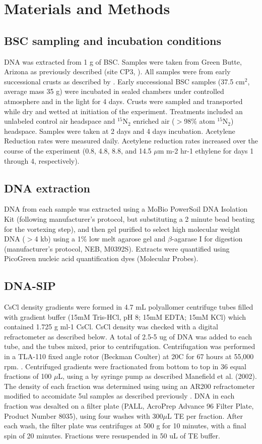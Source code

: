 \section{Materials and Methods}
\subsection{BSC sampling and incubation conditions}
DNA was extracted from 1 g of BSC. Samples were taken from Green Butte, Arizona
as previously described (site CP3, \citet{BERALDI_CAMPESI_2009}). All samples
were from early successional crusts as described by \cite{15643930}.  Early
successional BSC samples (37.5 cm$^{2}$, average mass 35 g) were incubated in
sealed chambers under controlled atmosphere and in the light for 4 days. Crusts
were sampled and transported while dry and wetted at initiation of the
experiment. Treatments included an unlabeled control air headspace and
$^{15}$N$_{2}$ enriched air ($>$98\% atom $^{15}$N$_{2}$) headspace. Samples
were taken at 2 days and 4 days incubation. Acetylene Reduction rates were
measured daily. Acetylene reduction rates increased over the course of the
experiment (0.8, 4.8, 8.8, and 14.5 $\mu$m m-2 hr-1 ethylene for days 1 through
4, respectively). 

\subsection{DNA extraction}
DNA from each sample was extracted using a MoBio PowerSoil DNA Isolation Kit
(following manufacturer’s protocol, but substituting a 2 minute bead beating
for the vortexing step), and then gel purified to select high molecular 
weight DNA ($>$4 kb) using a 1\% low melt agarose gel and $\beta$-agarase I for
digestion (manufacturer's protocol, NEB, M0392S).  Extracts were quantified using
PicoGreen nucleic acid quantification dyes (Molecular Probes).

\subsection{DNA-SIP} CsCl density gradients were formed in 4.7 mL polyallomer
centrifuge tubes filled with gradient buffer (15mM Tris-HCl, pH 8; 15mM EDTA;
15mM KCl) which contained 1.725 g ml-1 CsCl. CsCl density was checked with a
digital refractometer as described below. A total of 2.5-5 ug of DNA was added
to each tube, and the tubes mixed, prior to centrifugation. Centrifugation was
performed in a TLA-110 fixed angle rotor (Beckman Coulter) at 20C for 67 hours
at 55,000 rpm. \citep{17369332}. Centrifuged gradients were fractionated from
bottom to top in 36 equal fractions of 100 $\mu$L, using a by syringe pump as
described Manefield et al. (2002). The density of each fraction was determined
using using an AR200 refractometer modified to accomidate 5ul samples as 
described previously \citep{17369332}. DNA in each fraction was desalted on a
filter plate (PALL, AcroPrep Advance 96 Filter Plate, Product Number 8035),
using four washes with 300$\mu$L TE per fraction. After each wash, the filter
plate was centrifuges at 500 g for 10 minutes, with a final spin of 20 minutes.
Fractions were resuspended in 50 uL of TE buffer.

